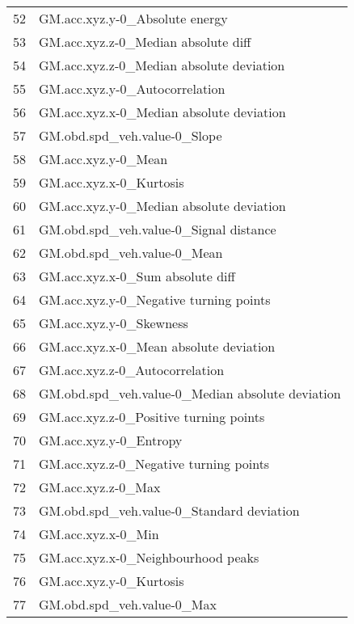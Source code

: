\begin{tabular}{ll}
52  &                    GM.acc.xyz.y-0\_Absolute energy \\
53  &               GM.acc.xyz.z-0\_Median absolute diff \\
54  &          GM.acc.xyz.z-0\_Median absolute deviation \\
55  &                    GM.acc.xyz.y-0\_Autocorrelation \\
56  &          GM.acc.xyz.x-0\_Median absolute deviation \\
57  &                      GM.obd.spd\_veh.value-0\_Slope \\
58  &                               GM.acc.xyz.y-0\_Mean \\
59  &                           GM.acc.xyz.x-0\_Kurtosis \\
60  &          GM.acc.xyz.y-0\_Median absolute deviation \\
61  &            GM.obd.spd\_veh.value-0\_Signal distance \\
62  &                       GM.obd.spd\_veh.value-0\_Mean \\
63  &                  GM.acc.xyz.x-0\_Sum absolute diff \\
64  &            GM.acc.xyz.y-0\_Negative turning points \\
65  &                           GM.acc.xyz.y-0\_Skewness \\
66  &            GM.acc.xyz.x-0\_Mean absolute deviation \\
67  &                    GM.acc.xyz.z-0\_Autocorrelation \\
68  &  GM.obd.spd\_veh.value-0\_Median absolute deviation \\
69  &            GM.acc.xyz.z-0\_Positive turning points \\
70  &                            GM.acc.xyz.y-0\_Entropy \\
71  &            GM.acc.xyz.z-0\_Negative turning points \\
72  &                                GM.acc.xyz.z-0\_Max \\
73  &         GM.obd.spd\_veh.value-0\_Standard deviation \\
74  &                                GM.acc.xyz.x-0\_Min \\
75  &                GM.acc.xyz.x-0\_Neighbourhood peaks \\
76  &                           GM.acc.xyz.y-0\_Kurtosis \\
77  &                        GM.obd.spd\_veh.value-0\_Max \\

\end{tabular}
